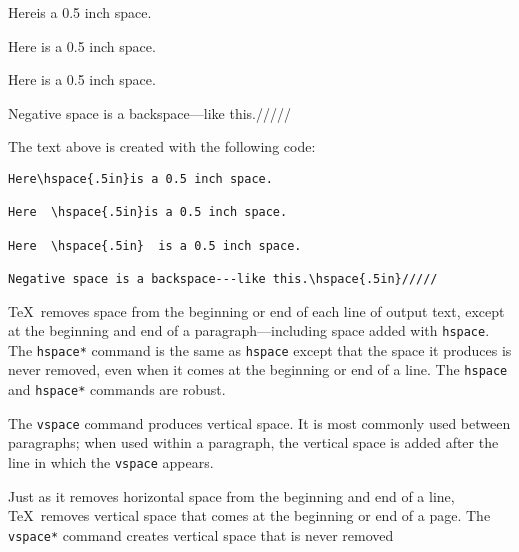 \documentclass{article}
\begin{document}
Here\hspace{.5in}is a 0.5 inch space.

Here  \hspace{.5in}is a 0.5 inch space.

Here  \hspace{.5in}  is a 0.5 inch space.

Negative space is a backspace---like this.\hspace{.5in}///// %

\bigskip

\noindent The text above is created with the following code: 

\begin{lstlisting}[language={[LaTeX]TeX}]
Here\hspace{.5in}is a 0.5 inch space.

Here  \hspace{.5in}is a 0.5 inch space.

Here  \hspace{.5in}  is a 0.5 inch space.

Negative space is a backspace---like this.\hspace{.5in}/////
\end{lstlisting}

\TeX\ removes space from the beginning or end of each line of output text, except at the beginning
and end of a paragraph---including space added with \verb:hspace:. 
The \verb:hspace*: command is the same as \verb:hspace: except that the space it produces is
never removed, even when it comes at the beginning or end of a line. 
The \verb:hspace: and \verb:hspace*: commands are robust.

The \verb:vspace: command produces vertical space. It is most commonly used between paragraphs;
when used within a paragraph, the vertical space is added after the line in which the 
\verb:vspace: appears.

Just as it removes horizontal space from the beginning and end of a line, \TeX\ removes vertical
space that comes at the beginning or end of a page. The \verb:vspace*: command creates vertical
space that is never removed


\end{document}
